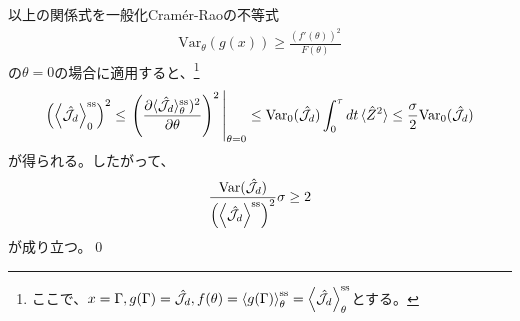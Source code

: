 \documentclass[a4paper,11pt]{jsarticle}
\numberwithin{equation}{section}
\begin{document}
以上の関係式を一般化Cram\'er-Raoの不等式
\begin{align}
    \text{Var}_{\theta}(g(x)) \geq \frac{(f'(\theta))^2}{F(\theta)}
\end{align}
の$\theta = 0$の場合に適用すると、\footnote{
    ここで、$x = \Gamma,g(\Gamma) = \hat{\mathcal{J}}_{d}, f(\theta) = \ev{g(\Gamma)}^{\text{ss}}_{\theta} = \ev{\hat{\mathcal{J}}_{d}}^{\text{ss}}_{\theta}$とする。
}
\begin{align}
    \qty(\ev{\hat{\mathcal{J}}_{d}}^{\text{ss}}_{0})^2\leq \eval{\left( \frac{\partial \langle {\hat{\mathcal{J}}_{d}} \rangle_\theta^{\text{ss}})^2}{\partial \theta} \right)^2}_{\theta = 0}
    \leq \mathrm{Var}_{0} (\hat{\mathcal{J}}_{d}) \int_0^\tau dt \, \langle \hat{Z}^2 \rangle \leq \frac{{\sigma}}{2} \mathrm{Var}_0 (\hat{\mathcal{J}}_{d})
\end{align}
が得られる。したがって、
\begin{align}
    \frac{\mathrm{Var}(\hat{\mathcal{J}}_{d})}{\qty(\ev{\hat{\mathcal{J}}_{d}}^{\text{ss}})^2} \sigma \geq 2
\end{align}
が成り立つ。\qed\\
\end{document}
